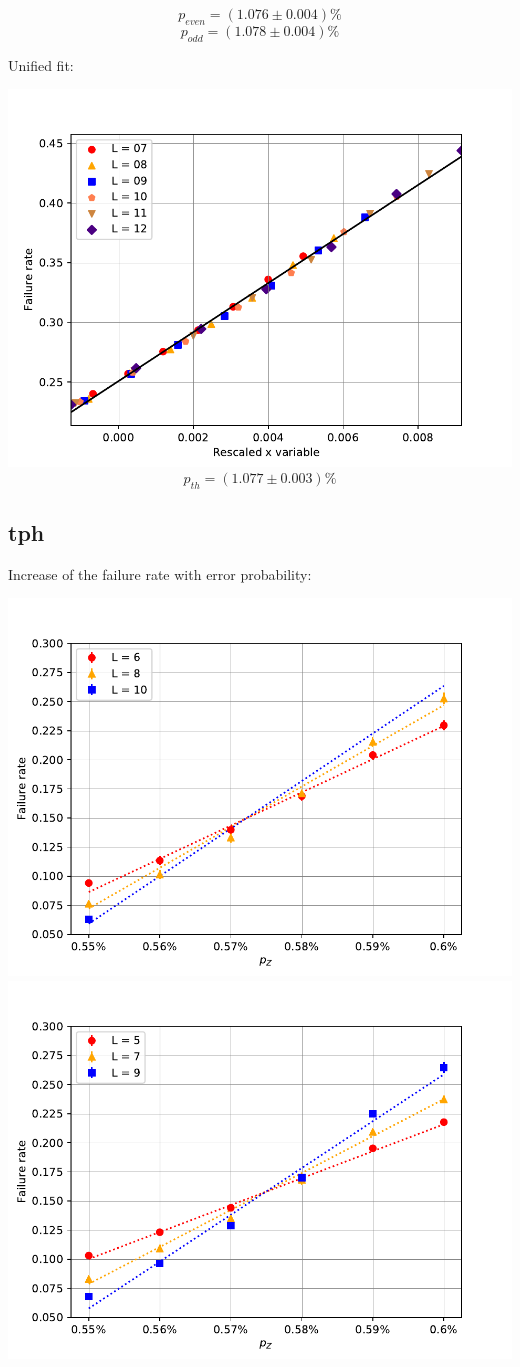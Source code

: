 \documentclass[pra]{revtex4-1}
\begin{document}
\[  p_{even} = (1.076 \pm 0.004)\% \]
\[  p_{odd} = (1.078 \pm 0.004)\% \]
\clearpage 

Unified fit: \begin{center} 

\includegraphics[width=.9\textwidth]{../graphs-paper2/ths-dephasing-rescaled.pdf}
\[  p_{th} = (1.077 \pm 0.003)\% \] \end{center}
\clearpage 

\subsection*{tph}
\noindent Increase of the failure rate with error probability: 
  
\includegraphics[width=.49\textwidth]{../graphs-paper2/tph-dephasing-even.pdf}
\includegraphics[width=.49\textwidth]{../graphs-paper2/tph-dephasing-odd.pdf}
\end{document}
